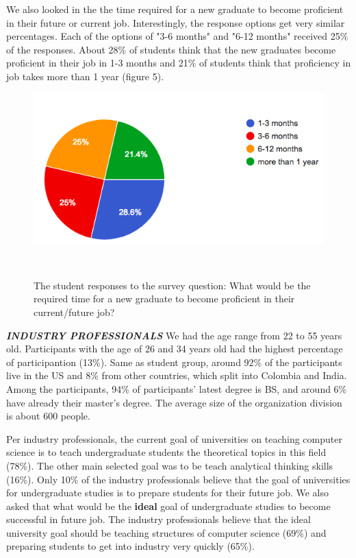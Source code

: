 \documentclass{sigchi}
\begin{document}
We also looked in the the time required for a new graduate to become proficient in their future or current job. Interestingly, the response options get very similar percentages. Each of the options of "3-6 months" and "6-12 months" received 25\% of the responses. About 28\% of students think that the new graduates become proficient in their job in 1-3 months and 21\% of students think that proficiency in job takes more than 1 year (figure 5).

\begin{figure}
\centering
  \includegraphics[width=1.05\columnwidth]{figures/time_proficiency_s}
  \caption{The student responses to the survey question: What would be the required time for a new graduate to become proficient in their current/future job? }~\label{fig:figure5}
\end{figure}


\textit{\textbf{INDUSTRY PROFESSIONALS}}\newline
We had the age range from 22 to 55 years old. Participants with the age of 26 and 34 years old had the highest percentage of participantion (13\%).
Same as student group, around 92\% of the participants live in the US and 8\% from other countries, which split into Colombia and India. Among the participants, 94\% of participants' latest degree is BS, and around 6\% have already their master's degree. The average size of the organization division is about 600 people. 

Per industry professionals, the current goal of universities on teaching computer science is to teach undergraduate students the theoretical topics in this field (78\%). The other main selected goal was to be teach analytical thinking skills (16\%). Only 10\% of the industry professionals believe that the goal of universities for undergraduate studies is to prepare students for their future job. 
We also asked that what would be the \textbf{ideal} goal of undergraduate studies to become successful in future job. The industry professionals believe that the ideal university goal should be teaching structures of computer science (69\%) and preparing students to get into industry very quickly (65\%).
\end{document}
